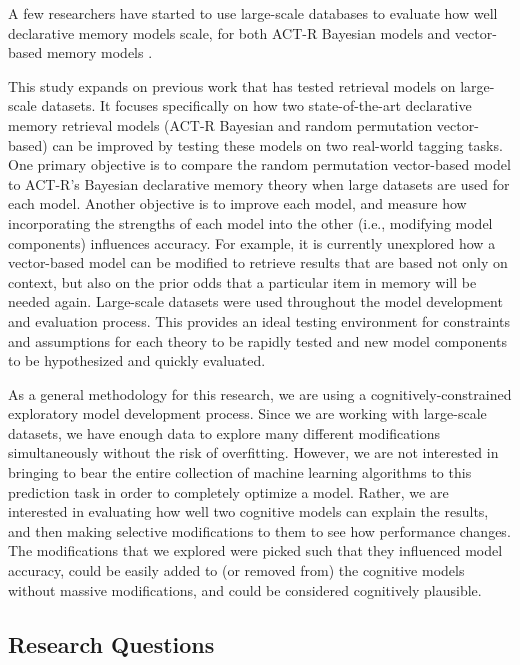 \documentclass[man,floatsintext,donotrepeattitle]{apa6}
\begin{document}
A few researchers have started to use large-scale databases to evaluate how well declarative memory models scale,
for both ACT-R Bayesian models \parencites{Fu2007,Pirolli2003,Stanley2013,Douglass2010} and vector-based memory models \parencites{Jones2007,Rutledge2008,Recchia2010,Sahlgren2008}.

This study expands on previous work that has tested retrieval models on large-scale datasets.
It focuses specifically on how two state-of-the-art declarative memory retrieval models (ACT-R Bayesian and random permutation vector-based) can be improved by testing these models on two real-world tagging tasks.
One primary objective is to compare the random permutation vector-based model to ACT-R's Bayesian declarative memory theory when large datasets are used for each model. 
Another objective is to improve each model, and measure how incorporating the strengths of each model into the other (i.e., modifying model components) influences accuracy.
For example, it is currently unexplored how a vector-based model can be modified to retrieve results that are based not only on context, but also on the prior odds that a particular item in memory will be needed again.
Large-scale datasets were used throughout the model development and evaluation process.
This provides an ideal testing environment for constraints and assumptions for each theory to be rapidly tested and new model components to be hypothesized and quickly evaluated.

As a general methodology for this research, we are using a cognitively-constrained exploratory model development process.
Since we are working with large-scale datasets, we have enough data to explore many different modifications simultaneously without the risk of overfitting.
However, we are not interested in bringing to bear the entire collection of machine learning algorithms to this prediction task in order to completely optimize a model.
Rather, we are interested in evaluating how well two cognitive models can explain the results, and then making selective modifications to them to see how performance changes.
The modifications that we explored were picked such that they influenced model accuracy, could be easily added to (or removed from) the cognitive models without massive modifications, and could be considered cognitively plausible.

\subsection{Research Questions}
\end{document}
